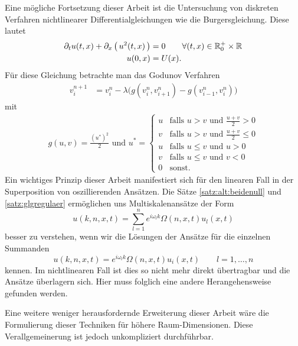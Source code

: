 
Eine mögliche Fortsetzung dieser Arbeit ist die Untersuchung von diskreten Verfahren nichtlinearer  Differentialgleichungen wie die Burgersgleichung.
Diese lautet
\begin{align}
\begin{split}
\partial_t u(t,x) + \partial_x \left( \, u^2(t,x) \,\right) &= 0 \qquad \forall (t,x) \in \mathbb R^+_0 \times \mathbb R\\
u(0,x) &= U(x).
\end{split}
\end{align}
Für diese Gleichung betrachte man das Godunov Verfahren
\begin{align}
v^{n+1}_i &= v^n_i - \lambda \bigl( g(v^n_i, v^n_{i+1}) - g(v^n_{i-1}, v^n_i) \bigr)
\end{align}
mit
\begin{align}
g(u,v) = \frac{\left(u^*\right)^2}2 \text{ und } u^* =
\begin{cases}
u & \text{falls $u > v$ und $\frac {u+v}2 > 0$}\\
v & \text{falls $u > v$ und $\frac {u+v}2 \leq 0$}\\
u & \text{falls $u \leq v$ und $u > 0$}\\
v & \text{falls $u \leq v$ und $v < 0$}\\
0 & \text{sonst.}
\end{cases}
\end{align}
Ein wichtiges Prinzip dieser Arbeit manifestiert sich für den linearen Fall in der Superposition von oszillierenden Ansätzen.
Die Sätze \ref{satz:alt:beidenull} und \ref{satz:glgregulaer} ermöglichen uns Multiskalenansätze der Form
\[ u(k,n,x,t) = \sum_{l=1}^n e^{i \omega_l k} \Omega(n,x,t) u_l(x,t) \]
besser zu verstehen, wenn wir die Lösungen der Ansätze für die einzelnen Summanden
\[ u(k,n,x,t) = e^{i \omega_l k} \Omega(n,x,t) u_i(x,t) \qquad l = 1, \ldots, n\]
kennen.
Im nichtlinearen Fall ist dies so nicht mehr direkt übertragbar und die Ansätze überlagern sich.
Hier muss folglich eine andere Herangehensweise gefunden werden.

Eine weitere weniger herausfordernde Erweiterung dieser Arbeit wäre die Formulierung dieser Techniken für höhere Raum-Dimensionen.
Diese Verallgemeinerung ist jedoch unkompliziert durchführbar.